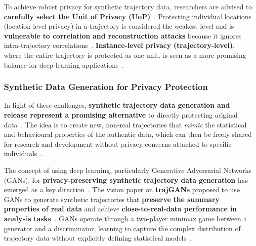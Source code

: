 \documentclass[runningheads]{llncs}
\begin{document}
To achieve robust privacy for synthetic trajectory data, researchers are advised to \textbf{carefully select the Unit of Privacy (UoP)}~\cite{Buchholz2024SoK,Primault2019LongRoad}. Protecting individual locations (location-level privacy) in a trajectory is considered the weakest level and is \textbf{vulnerable to correlation and reconstruction attacks} because it ignores intra-trajectory correlations~\cite{Buchholz2024SoK,Buchholz2022RAoPT,Primault2014DPLPP,Errounda2019AnalysisDPLocation}. \textbf{Instance-level privacy (trajectory-level)}, where the entire trajectory is protected as one unit, is seen as a more promising balance for deep learning applications~\cite{Buchholz2024SoK}.

\subsubsection{Synthetic Data Generation for Privacy Protection}

In light of these challenges, \textbf{synthetic trajectory data generation and release represent a promising alternative} to directly protecting original data~\cite{Buchholz2024SoK,Rao2021LSTMTrajGAN,Liu2018TrajGANs}. The idea is to create new, non-real trajectories that \textit{mimic} the statistical and behavioural properties of the authentic data, which can then be freely shared for research and development without privacy concerns attached to specific individuals~\cite{Rao2021LSTMTrajGAN,Liu2018TrajGANs,Qu2020GANs5G}.

The concept of using deep learning, particularly Generative Adversarial Networks (GANs), for \textbf{privacy-preserving synthetic trajectory data generation} has emerged as a key direction~\cite{Buchholz2024SoK,Liu2018TrajGANs,Rao2021LSTMTrajGAN,Qu2020GANs5G}. The vision paper on \textbf{trajGANs} proposed to use GANs to generate synthetic trajectories that \textbf{preserve the summary properties of real data} and achieve \textbf{close-to-real-data performance in analysis tasks}~\cite{Liu2018TrajGANs,Rao2021LSTMTrajGAN}. GANs operate through a two-player minimax game between a generator and a discriminator, learning to capture the complex distribution of trajectory data without explicitly defining statistical models~\cite{Rao2021LSTMTrajGAN,Qu2020GANs5G,Buchholz2024SoK,Ponomareva2023HowToDPfyML}.
\end{document}
